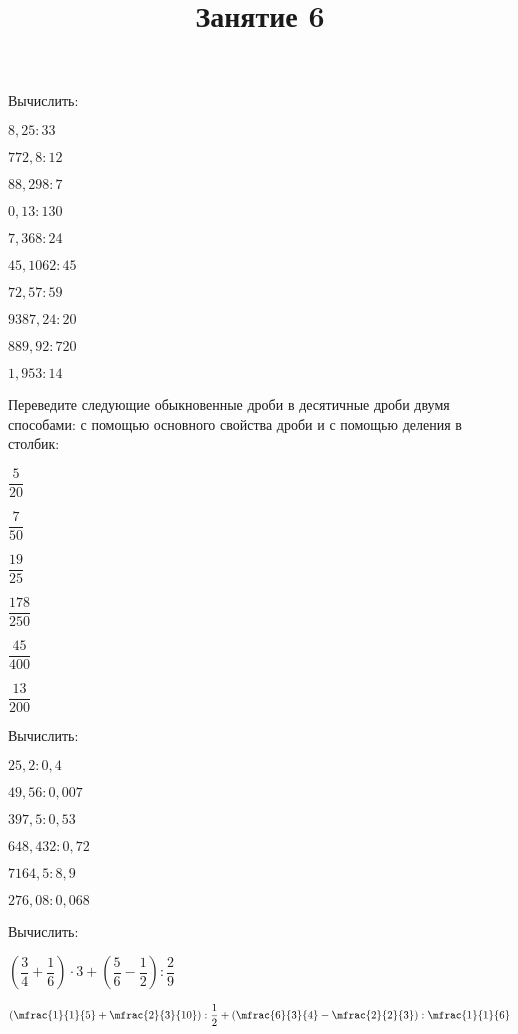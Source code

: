 \begin{class}[number=6]
	\title{Занятие 6}
	\begin{listofex}
		\item Вычислить:
			\begin{enumcols}[itemcolumns=5]
				\item \( 8,25:33 \)
				\item \( 772,8:12 \)
				\item \( 88,298: 7 \)
				\item \( 0,13:130 \)
				\item \( 7,368: 24 \)
				\item \( 45,1062: 45 \)
				\item \( 72,57 :59 \)
				\item \( 9387,24: 20 \)
				\item \( 889,92:720 \)
				\item \( 1,953:14 \)
			\end{enumcols}
		\item Переведите следующие обыкновенные дроби в десятичные дроби двумя способами: с помощью основного свойства дроби и с помощью деления в столбик:
			\begin{enumcols}[itemcolumns=6]
				\item \( \dfrac{5}{20} \)
				\item \( \dfrac{7}{50} \)
				\item \( \dfrac{19}{25} \)
				\item \( \dfrac{178}{250} \)
				\item \( \dfrac{45}{400} \)
				\item \( \dfrac{13}{200} \)
			\end{enumcols}
		\item Вычислить:
			\begin{enumcols}[itemcolumns=2]
				\item \( 25,2: 0,4 \)
				\item \( 49,56:0,007 \)
				\item \( 397,5:0,53 \)
				\item \( 648,432:0,72 \)
				\item \( 7164,5:8,9 \)
				\item \( 276,08:0,068 \)
			\end{enumcols}
		\item Вычислить:
			\begin{enumcols}[itemcolumns=2]
			\item \( \left( \dfrac{3}{4}+\dfrac{1}{6} \right)\cdot 3 + \left( \dfrac{5}{6}-\dfrac{1}{2} \right) : \dfrac{2}{9} \)
			\item \( \left( \mfrac{1}{1}{5}+\mfrac{2}{3}{10} \right) : \dfrac{1}{2} + \left( \mfrac{6}{3}{4}-\mfrac{2}{2}{3} \right) : \mfrac{1}{1}{6} \)
			\end{enumcols}
	\end{listofex}
\end{class}


